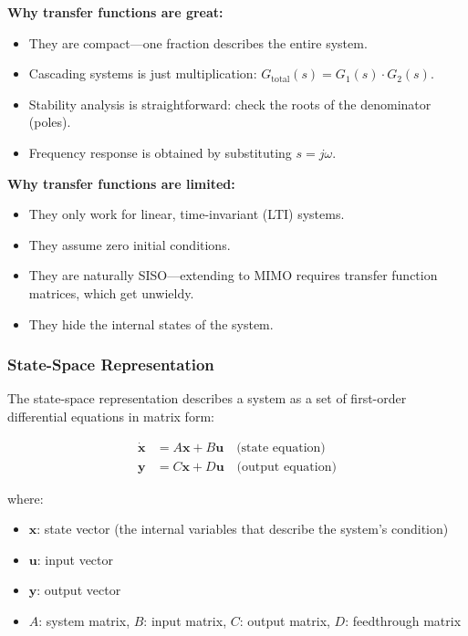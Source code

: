 \textbf{Why transfer functions are great:}
\begin{itemize}
    \item They are compact---one fraction describes the entire system.
    \item Cascading systems is just multiplication: $G_{\text{total}}(s) = G_1(s) \cdot G_2(s)$.
    \item Stability analysis is straightforward: check the roots of the denominator (poles).
    \item Frequency response is obtained by substituting $s = j\omega$.
\end{itemize}

\textbf{Why transfer functions are limited:}
\begin{itemize}
    \item They only work for linear, time-invariant (LTI) systems.
    \item They assume zero initial conditions.
    \item They are naturally SISO---extending to MIMO requires transfer function matrices, which get unwieldy.
    \item They hide the internal states of the system.
\end{itemize}

\subsubsection{State-Space Representation}

The state-space representation describes a system as a set of first-order differential equations in matrix form:

\begin{align}
\dot{\mathbf{x}} &= A\mathbf{x} + B\mathbf{u} \quad \text{(state equation)} \\
\mathbf{y} &= C\mathbf{x} + D\mathbf{u} \quad \text{(output equation)}
\end{align}

where:
\begin{itemize}[nosep]
    \item $\mathbf{x}$: state vector (the internal variables that describe the system's condition)
    \item $\mathbf{u}$: input vector
    \item $\mathbf{y}$: output vector
    \item $A$: system matrix, $B$: input matrix, $C$: output matrix, $D$: feedthrough matrix
\end{itemize}

